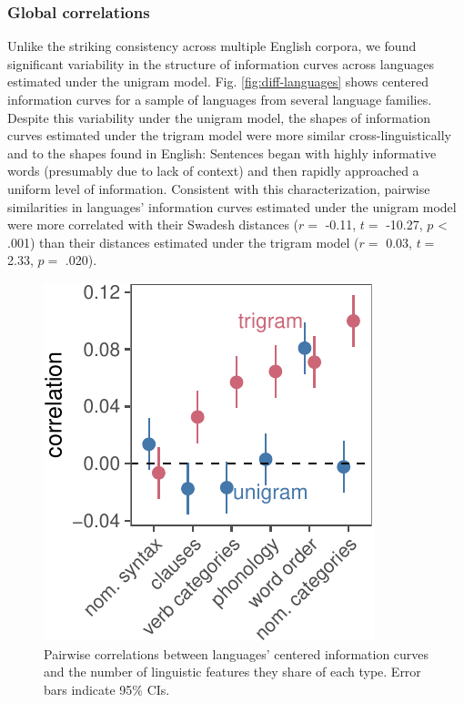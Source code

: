 \documentclass[man,floatsintext]{apa6}
\begin{document}
\hypertarget{global-correlations}{%
\subsubsection{Global correlations}\label{global-correlations}}

Unlike the striking consistency across multiple English corpora, we found significant variability in the structure of information curves across languages estimated under the unigram model. Fig. \ref{fig:diff-languages} shows centered information curves for a sample of languages from several language families. Despite this variability under the unigram model, the shapes of information curves estimated under the trigram model were more similar cross-linguistically and to the shapes found in English: Sentences began with highly informative words (presumably due to lack of context) and then rapidly approached a uniform level of information. Consistent with this characterization, pairwise similarities in languages' information curves estimated under the unigram model were more correlated with their Swadesh distances (\(r =\) -0.11, \(t =\) -10.27, \(p\) \textless{} .001) than their distances estimated under the trigram model (\(r =\) 0.03, \(t =\) 2.33, \(p =\) .020).

\begin{figure}[tb]

{\centering \includegraphics{figs/type-cors-1} 

}

\caption{Pairwise correlations between languages' centered information curves and the number of linguistic features they share of each type. Error bars indicate 95\% CIs.}\label{fig:type-cors}
\end{figure}
\end{document}
